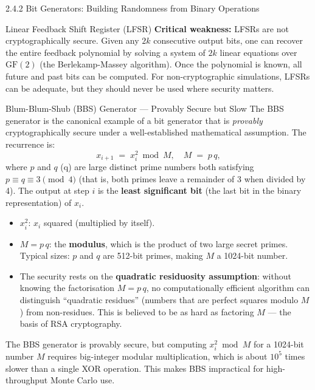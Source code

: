 \documentclass[aspectratio=169,10pt]{beamer}
\begin{document}
\begin{frame}[allowframebreaks]{2.4.2 Bit Generators: Building Randomness from Binary Operations}
\begin{block}{Linear Feedback Shift Register (LFSR)}
\textbf{Critical weakness:} LFSRs are not cryptographically secure.  Given
any $2k$ consecutive output bits, one can recover the entire feedback
polynomial by solving a system of $2k$ linear equations over $\mathrm{GF}(2)$
(the Berlekamp-Massey algorithm).  Once the polynomial is known, all future
and past bits can be computed.  For non-cryptographic simulations, LFSRs
can be adequate, but they should never be used where security matters.
\end{block}

\framebreak

\begin{block}{Blum-Blum-Shub (BBS) Generator --- Provably Secure but Slow}
The BBS generator is the canonical example of a bit generator that is
\emph{provably} cryptographically secure under a well-established mathematical
assumption.  The recurrence is:
\[
  x_{i+1} \;=\; x_i^2 \bmod M, \quad M \;=\; p\,q,
\]
where $p$ and $q$ (q) are large distinct prime numbers both satisfying
$p \equiv q \equiv 3 \pmod{4}$ (that is, both primes leave a remainder of
3 when divided by 4).  The output at step $i$ is the \textbf{least significant
bit} (the last bit in the binary representation) of $x_i$.

\begin{itemize}
  \item $x_i^2$: $x_i$ squared (multiplied by itself).
  \item $M = p\,q$: the \textbf{modulus}, which is the product of two large
    secret primes.  Typical sizes: $p$ and $q$ are 512-bit primes, making
    $M$ a 1024-bit number.
  \item The security rests on the \textbf{quadratic residuosity assumption}:
    without knowing the factorisation $M = p\,q$, no computationally efficient
    algorithm can distinguish ``quadratic residues'' (numbers that are perfect
    squares modulo $M$) from non-residues.  This is believed to be as hard as
    factoring $M$ --- the basis of RSA cryptography.
\end{itemize}

The BBS generator is provably secure, but computing $x_i^2 \bmod M$ for a
1024-bit number $M$ requires big-integer modular multiplication, which is
about $10^5$ times slower than a single XOR operation.  This makes BBS
impractical for high-throughput Monte Carlo use.
\end{block}


\end{frame}
\end{document}
